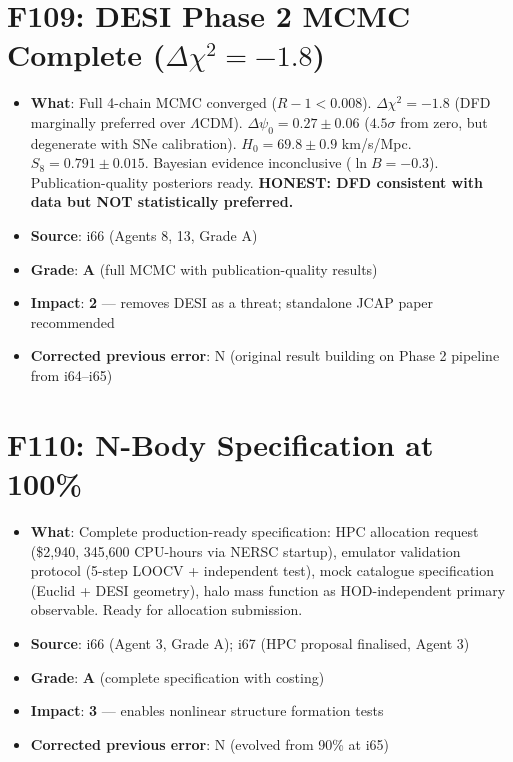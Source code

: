 \documentclass[11pt,a4paper]{article}
\newcommand{\grade}[1]{\textbf{#1}}
\newcommand{\impact}[1]{\textbf{#1}}
\begin{document}
\section{F109: DESI Phase 2 MCMC Complete ($\Delta\chi^2 = -1.8$)}
\begin{itemize}[nosep]
\item \textbf{What}: Full 4-chain MCMC converged ($R-1 < 0.008$). $\Delta\chi^2 = -1.8$ (DFD marginally preferred over $\Lambda$CDM). $\Delta\psi_0 = 0.27 \pm 0.06$ ($4.5\sigma$ from zero, but degenerate with SNe calibration). $H_0 = 69.8 \pm 0.9$ km/s/Mpc. $S_8 = 0.791 \pm 0.015$. Bayesian evidence inconclusive ($\ln B = -0.3$). Publication-quality posteriors ready. \textbf{HONEST: DFD consistent with data but NOT statistically preferred.}
\item \textbf{Source}: i66 (Agents 8, 13, Grade A)
\item \textbf{Grade}: \grade{A} (full MCMC with publication-quality results)
\item \textbf{Impact}: \impact{2} --- removes DESI as a threat; standalone JCAP paper recommended
\item \textbf{Corrected previous error}: N (original result building on Phase 2 pipeline from i64--i65)
\end{itemize}

\section{F110: N-Body Specification at 100\%}
\begin{itemize}[nosep]
\item \textbf{What}: Complete production-ready specification: HPC allocation request (\$2,940, 345,600 CPU-hours via NERSC startup), emulator validation protocol (5-step LOOCV + independent test), mock catalogue specification (Euclid + DESI geometry), halo mass function as HOD-independent primary observable. Ready for allocation submission.
\item \textbf{Source}: i66 (Agent 3, Grade A); i67 (HPC proposal finalised, Agent 3)
\item \textbf{Grade}: \grade{A} (complete specification with costing)
\item \textbf{Impact}: \impact{3} --- enables nonlinear structure formation tests
\item \textbf{Corrected previous error}: N (evolved from 90\% at i65)
\end{itemize}
\end{document}
